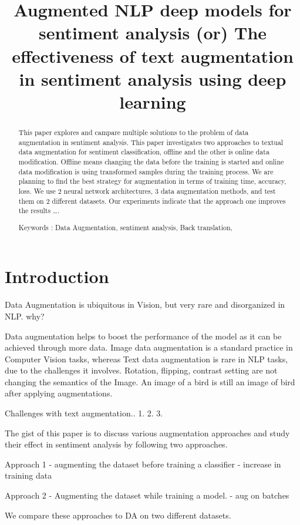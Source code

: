 \documentclass{article}
\title{Augmented NLP deep models for sentiment analysis  (or)  The effectiveness of text augmentation in sentiment analysis using deep learning}
\begin{document}
\maketitle

\begin{abstract}
This paper explores and campare multiple solutions to the problem of data augmentation in sentiment analysis.
This paper investigates two approaches to textual data augmentation for sentiment classification, offline and the other is online data modification. 
Offline means changing the data before the training is started and online data modification is using transformed samples during the training process. 
We are planning to find the best strategy for augmentation in terms of training time, accuracy, loss. 
We use 2 neural network architectures, 3 data augmentation methods, and test them on 2 different datasets. 
Our experiments indicate that the approach one improves the results ….


Keywords :  Data Augmentation, sentiment analysis, Back translation,


\end{abstract}

 

\section{Introduction}

Data Augmentation is ubiquitous in Vision, but very rare and disorganized in NLP. why?

Data augmentation helps to boost the performance of the model as it can be achieved through more data.
Image data augmentation is a standard practice in Computer Vision tasks, whereas Text data augmentation is rare in NLP tasks, due to the challenges it involves.
Rotation, flipping, contrast setting are not changing the semantics of the Image. An image of a bird is still an image of bird after applying augmentations.

Challenges with text augmentation..
1.
2.
3. 

The gist of this paper is to discuss various augmentation approaches and study their effect in sentiment analysis by following two approaches.

Approach 1 - augmenting the dataset before training a classifier - increase in training data

Approach 2 - Augmenting the dataset while training a model. - aug on batches

We compare these approaches to DA on two different datasets.
\end{document}
